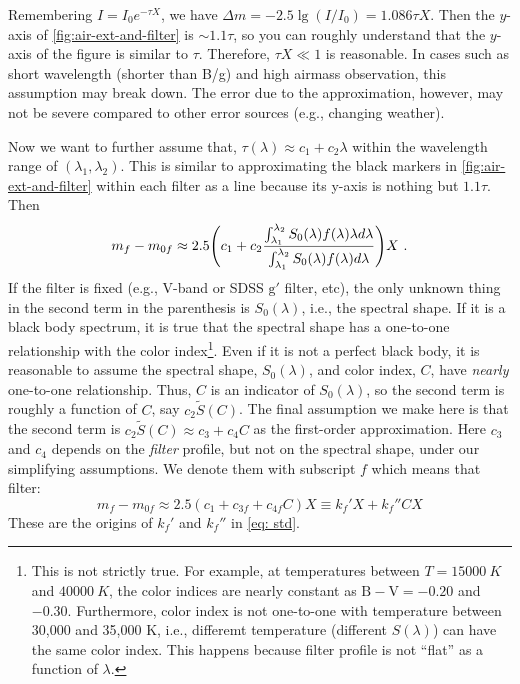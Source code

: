 Remembering $ I = I_0 e^{-\tau X} $, we have $ \Delta m = -2.5 \lg (I / I_0) = 1.086 \tau X $. Then the $ y $-axis of \cref{fig:air-ext-and-filter} is $ \sim 1.1 \tau $, so you can roughly understand that the $ y $-axis of the figure is similar to $ \tau $. Therefore, $ \tau X \ll 1 $ is reasonable. In cases such as short wavelength (shorter than B/g) and high airmass observation, this assumption may break down. The error due to the approximation, however, may not be severe compared to other error sources (e.g., changing weather). 

Now we want to further assume that, $ \tau(\lambda) \approx c_1 + c_2 \lambda $ within the wavelength range of $ (\lambda_1, \lambda_2) $. This is similar to approximating the black markers in \cref{fig:air-ext-and-filter} within each filter as a line because its y-axis is nothing but $ 1.1 \tau $. Then
\begin{equation}
  m_f - m_{0f} 
    \approx 2.5 
    \qty (c_1 + c_2\frac{\int_{\lambda_1}^{\lambda_2} S_0(\lambda) f(\lambda) \lambda d\lambda}
      {\int_{\lambda_1}^{\lambda_2} S_0(\lambda) f(\lambda) d\lambda} ) X ~.
\end{equation}
If the filter is fixed (e.g., V-band or SDSS $ \mathrm{g'} $ filter, etc), the only unknown thing in the second term in the parenthesis is $ S_0(\lambda) $, i.e., the spectral shape. If it is a black body spectrum, it is true that the spectral shape has a one-to-one relationship with the color index\footnote{This is not strictly true. For example, at temperatures between $ T = \SI{15000}{K} $ and $ \SI{40000}{K} $, the color indices are nearly constant as $ \mathrm{B - V} = -0.20 $ and $ -0.30 $. Furthermore, color index is not one-to-one with temperature between 30,000 and 35,000 K, i.e., differemt temperature (different $ S(\lambda) $) can have the same color index. This happens because filter profile is not ``flat'' as a function of $ \lambda $.}.
Even if it is not a perfect black body, it is reasonable to assume the spectral shape, $ S_0(\lambda) $, and color index, $ C $, have \textit{nearly} one-to-one relationship. Thus, $ C $ is an indicator of $ S_0(\lambda) $, so the second term is roughly a function of $ C $, say $ c_2 \tilde{S}(C) $. The final assumption we make here is that the second term is $ c_2 \tilde{S} (C) \approx c_3 + c_4 C $ as the first-order approximation. Here $ c_3 $ and $ c_4 $ depends on the \textit{filter} profile, but not on the spectral shape, under our simplifying assumptions. We denote them with subscript $ f $ which means that filter:
\begin{equation}\label{key}
  m_f - m_{0f} 
  \approx 2.5 (c_1 + c_{3f} + c_{4f} C) X 
  \equiv k_f' X + k_f'' CX
\end{equation}
 These are the origins of $ k_f' $ and $ k_f'' $ in \cref{eq: std}.

